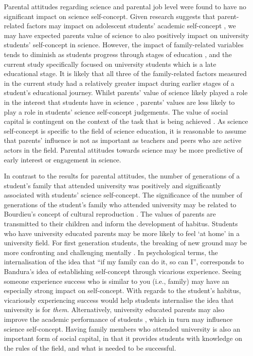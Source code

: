 Parental attitudes regarding science and parental job level were found to have no significant impact on science self-concept. Given research suggests that parent-related factors may impact on adolescent students' academic self-concept \citep{fan2010effects}, we may have expected parents value of science to also positively impact on university students' self-concept in science. However, the impact of family-related variables tends to diminish as students progress through stages of education \citep{holm2011dealing}, and the current study specifically focused on university students which is a late educational stage. It is likely that all three of the family-related factors measured in the current study had a relatively greater impact during earlier stages of a student's educational journey. Whilst parents' value of science likely played a role in the interest that students have in science \citep{archer2013aspires}, parents' values are less likely to play a role in students' science self-concept judgements. The value of social capital is contingent on the context of the task that is being achieved \citep{Adler2017}. As science self-concept is specific to the field of science education, it is reasonable to assume that parents' influence is not as important as teachers and peers who are active actors in the field. Parental attitudes towards science may be more predictive of early interest or engagement in science.  

In contrast to the results for parental attitudes, the number of generations of a student's family that attended university was positively and significantly associated with students' science self-concept. The significance of the number of generations of the student's family who attended university may be related to Bourdieu's concept of cultural reproduction \citep{Dimaggio1982}. The values of parents are transmitted to their children and inform the development of habitus. Students who have university educated parents may be more likely to feel `at home' in a university field. For first generation students, the breaking of new ground may be more confronting and challenging mentally \citep{gardner2011those}. In psychological terms, the internalisation of the idea that ``if my family can do it, so can I'', corresponds to Bandura's \citep{bandura1986explanatory} idea of establishing self-concept through vicarious experience. Seeing someone experience success who is similar to you (i.e., family) may have an especially strong impact on self-concept. With regards to the student's habitus, vicariously experiencing success would help students internalise the idea that university is for \textit{them}. Alternatively, university educated parents may also improve the academic performance of students \citep{paul2011cultural}, which in turn may influence science self-concept. Having family members who attended university is also an important form of social capital, in that it provides students with knowledge on the rules of the field, and what is needed to be successful.

